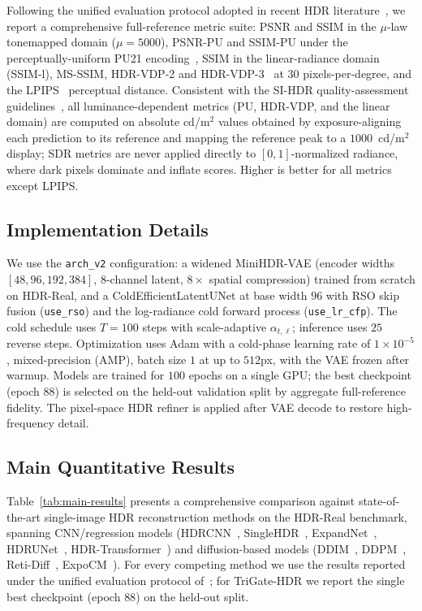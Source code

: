 \documentclass[10pt,twocolumn,letterpaper]{article}
\begin{document}
Following the unified evaluation protocol adopted in recent HDR literature~\cite{expocm}, we report a comprehensive full-reference metric suite: PSNR and SSIM in the $\mu$-law tonemapped domain ($\mu=5000$), PSNR-PU and SSIM-PU under the perceptually-uniform PU21 encoding~\cite{pu21}, SSIM in the linear-radiance domain (SSIM-l), MS-SSIM, HDR-VDP-2 and HDR-VDP-3~\cite{hdrvdp} at $30$ pixels-per-degree, and the LPIPS~\cite{lpips} perceptual distance. Consistent with the SI-HDR quality-assessment guidelines~\cite{hanji2022}, all luminance-dependent metrics (PU, HDR-VDP, and the linear domain) are computed on absolute cd/m$^2$ values obtained by exposure-aligning each prediction to its reference and mapping the reference peak to a $1000$~cd/m$^2$ display; SDR metrics are never applied directly to $[0,1]$-normalized radiance, where dark pixels dominate and inflate scores. Higher is better for all metrics except LPIPS.

\subsection{Implementation Details}
\label{sec:impl}

We use the \texttt{arch\_v2} configuration: a widened MiniHDR-VAE (encoder widths $[48,96,192,384]$, $8$-channel latent, $8\times$ spatial compression) trained from scratch on HDR-Real, and a ColdEfficientLatentUNet at base width $96$ with RSO skip fusion (\texttt{use\_rso}) and the log-radiance cold forward process (\texttt{use\_lr\_cfp}). The cold schedule uses $T=100$ steps with scale-adaptive $\alpha_{t,\ell}$; inference uses $25$ reverse steps. Optimization uses Adam with a cold-phase learning rate of $1\times10^{-5}$, mixed-precision (AMP), batch size $1$ at up to $512$px, with the VAE frozen after warmup. Models are trained for $100$ epochs on a single GPU; the best checkpoint (epoch $88$) is selected on the held-out validation split by aggregate full-reference fidelity. The pixel-space HDR refiner is applied after VAE decode to restore high-frequency detail.

\subsection{Main Quantitative Results}

Table~\ref{tab:main-results} presents a comprehensive comparison against state-of-the-art single-image HDR reconstruction methods on the HDR-Real benchmark, spanning CNN/regression models (HDRCNN~\cite{hdrcnn}, SingleHDR~\cite{singlehdr}, ExpandNet~\cite{expandnet}, HDRUNet~\cite{hdrunet}, HDR-Transformer~\cite{hdrtransformer}) and diffusion-based models (DDIM~\cite{ddim}, DDPM~\cite{ddpm}, Reti-Diff~\cite{retidiff}, ExpoCM~\cite{expocm}). For every competing method we use the results reported under the unified evaluation protocol of~\cite{expocm}; for TriGate-HDR we report the single best checkpoint (epoch $88$) on the held-out split.
\end{document}
